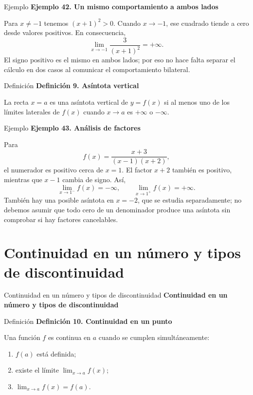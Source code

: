 \documentclass[12pt,aspectratio=169]{beamer}
\begin{document}
\begin{frame}[t,allowframebreaks]{Ejemplo}
{\color{azul}\bfseries Ejemplo 42. Un mismo comportamiento a ambos lados}\par\medskip

Para $x\ne-1$ tenemos $(x+1)^2>0$. Cuando $x\to-1$, ese cuadrado tiende a cero desde valores positivos. En consecuencia,
\[
 \boxed{\lim_{x\to-1}\frac{3}{(x+1)^2}=+\infty.}
\]
El signo positivo es el mismo en ambos lados; por eso no hace falta separar el cálculo en dos casos al comunicar el comportamiento bilateral.
\end{frame}


\begin{frame}[t,allowframebreaks]{Definición}
{\color{azul}\bfseries Definición 9. Asíntota vertical}\par\medskip

La recta $x=a$ es una asíntota vertical de $y=f(x)$ si al menos uno de los límites laterales de $f(x)$ cuando $x\to a$ es $+\infty$ o $-\infty$.
\end{frame}


\begin{frame}[t,allowframebreaks]{Ejemplo}
{\color{azul}\bfseries Ejemplo 43. Análisis de factores}\par\medskip

Para
\[
 f(x)=\frac{x+3}{(x-1)(x+2)},
\]
el numerador es positivo cerca de $x=1$. El factor $x+2$ también es positivo, mientras que $x-1$ cambia de signo. Así,
\[
 \lim_{x\to1^-}f(x)=-\infty,\qquad
 \lim_{x\to1^+}f(x)=+\infty.
\]
También hay una posible asíntota en $x=-2$, que se estudia separadamente; no debemos asumir que todo cero de un denominador produce una asíntota sin comprobar si hay factores cancelables.
\end{frame}


\section{Continuidad en un número y tipos de discontinuidad}

\begin{frame}[t]{Continuidad en un número y tipos de discontinuidad}
\centering\vfill{\Large\bfseries\color{azul} Continuidad en un número y tipos de discontinuidad}\vfill
\end{frame}


\begin{frame}[t,allowframebreaks]{Definición}
{\color{azul}\bfseries Definición 10. Continuidad en un punto}\par\medskip

Una función $f$ es continua en $a$ cuando se cumplen simultáneamente:
\begin{enumerate}
 \item $f(a)$ está definida;
 \item existe el límite $\lim_{x\to a}f(x)$;
 \item $\displaystyle\lim_{x\to a}f(x)=f(a)$.
\end{enumerate}
\end{frame}
\end{document}

